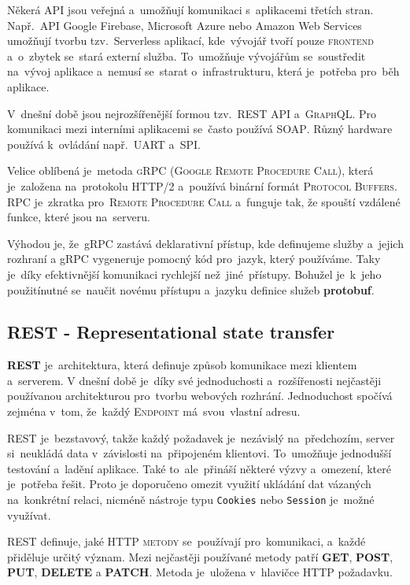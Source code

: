 \documentclass[14pt,a4paper]{article}
\begin{document}
        Někerá \textsc{API} jsou veřejná a~umožňují komunikaci s~aplikacemi třetích stran. Např.~\textsc{API} Google Firebase, Microsoft Azure nebo Amazon Web Services umožňují tvorbu tzv.~Serverless aplikací, kde~vývojář tvoří pouze \textsc{frontend} a~o~zbytek se~stará externí služba. To~umožňuje vývojářům se~soustředit na~vývoj aplikace a~nemusí se~starat o~infrastrukturu, která je~potřeba pro~běh aplikace.

        V~dnešní době jsou nejrozšířenější formou tzv.~\textsc{REST API} a~\textsc{GraphQL}. Pro komunikaci mezi interními aplikacemi se~často používá \textsc{SOAP}. Různý hardware používá k~ovládání např.~\textsc{UART} a~\textsc{SPI}.

        Velice oblíbená je~metoda \textsc{gRPC} (\textsc{Google Remote Procedure Call}), která je~založena na~protokolu HTTP/2 a~používá binární formát \textsc{Protocol Buffers}. \textsc{RPC} je~zkratka pro~\textsc{Remote Procedure Call} a~funguje tak, že spouští vzdálené funkce, které jsou na~serveru.
        
        Výhodou je, že~gRPC zastává deklarativní přístup, kde definujeme služby a~jejich rozhraní a gRPC vygeneruje pomocný kód pro~jazyk, který používáme. Taky je~díky efektivnější komunikaci rychlejší než~jiné~přístupy. Bohužel je~k~jeho použitínutné se~naučit novému přístupu a~jazyku definice služeb \textbf{protobuf}. \parencite{thenewstackBuildRealWorld}

        \subsection{REST - Representational state transfer}
        \textbf{REST} je~architektura, která definuje způsob komunikace mezi klientem a~serverem. V dnešní době je~díky své jednoduchosti a~rozšířenosti nejčastěji používanou architekturou pro~tvorbu webových rozhrání. Jednoduchost spočívá zejména v~tom, že~každý \textsc{Endpoint} má~svou~vlastní adresu.
        
        \textsc{REST} je~bezstavový, takže každý požadavek je~nezávislý na~předchozím, server si~neukládá data v~závislosti na~připojeném klientovi. To~umožňuje jednodušší testování a~ladění aplikace. Také to~ale~přináší některé výzvy a~omezení, které je~potřeba řešit. Proto je doporučeno omezit využití ukládání dat vázaných na~konkrétní relaci, nicméně nástroje typu \texttt{Cookies} nebo \texttt{Session} je~možné využívat.
        
        \textsc{REST} definuje, jaké \textsc{HTTP metody} se~používají pro~komunikaci, a~každé přiděluje určitý význam. Mezi nejčastěji používané metody patří \textbf{GET}, \textbf{POST}, \textbf{PUT}, \textbf{DELETE} a \textbf{PATCH}. Metoda je~uložena v~hlavičce HTTP požadavku.
\end{document}
